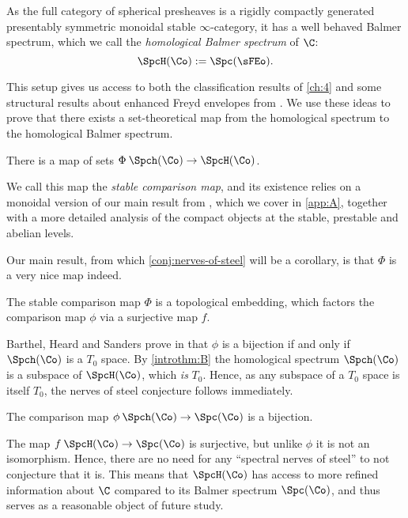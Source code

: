 As the full category of spherical presheaves is a rigidly compactly generated presentably symmetric monoidal stable $\infty$-category, it has a well behaved Balmer spectrum, which we call the \emph{homological Balmer spectrum} of $\C$: 
\[\SpcH(\Co) := \Spc(\sFEo).\]

This setup gives us access to both the classification results of \cref{ch:4} and some structural results about enhanced Freyd envelopes from \cite{patchkoria-pstragowski_2021}. We use these ideas to prove that there exists a set-theoretical map from the homological spectrum to the homological Balmer spectrum. 

\begin{introthm}[{\ref{thm:existence-of-Phi}}]
    \label{introthm:A}
    There is a map of sets $\Phi\: \Spch(\Co)\to \SpcH(\Co)$.
\end{introthm}

We call this map the \emph{stable comparison map}, and its existence relies on a monoidal version of our main result from \cite{aambo_2024_localizing}, which we cover in \cref{app:A}, together with a more detailed analysis of the compact objects at the stable, prestable and abelian levels. 

Our main result, from which \cref{conj:nerves-of-steel} will be a corollary, is that $\Phi$ is a very nice map indeed. 

\begin{introthm}[{\ref{lm:Phi-is-injective}, \ref{lm:Phi-is-continuous-and-closed}, \ref{prop:Phi-factors-phi}}]
    \label{introthm:B}
    The stable comparison map $\Phi$ is a topological embedding, which factors the comparison map $\phi$ via a surjective map $f$. 
\end{introthm}

Barthel, Heard and Sanders prove in \cite[4.5]{barthel_heard_sanders_2022} that $\phi$ is a bijection if and only if $\Spch(\Co)$ is a $T_0$ space. By \cref{introthm:B} the homological spectrum $\Spch(\Co)$ is a subspace of $\SpcH(\Co)$, which \emph{is} $T_0$. Hence, as any subspace of a $T_0$ space is itself $T_0$, the nerves of steel conjecture follows immediately. 

\begin{introthm}[{\ref{thm:nerves-of-steel}}]
    \label{introthm:C}
    The comparison map $\phi\: \Spch(\Co)\to \Spc(\Co)$ is a bijection. 
\end{introthm}

The map $f\: \SpcH(\Co)\to \Spc(\Co)$ is surjective, but unlike $\phi$ it is not an isomorphism. Hence, there are no need for any ``spectral nerves of steel'' to not conjecture that it is. This means that $\SpcH(\Co)$ has access to more refined information about $\C$ compared to its Balmer spectrum $\Spc(\Co)$, and thus serves as a reasonable object of future study. 

